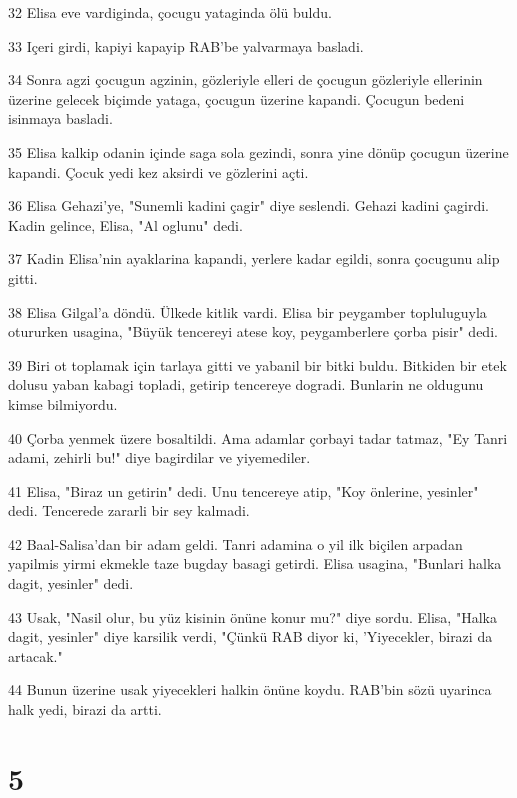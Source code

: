 \par 32 Elisa eve vardiginda, çocugu yataginda ölü buldu.
\par 33 Içeri girdi, kapiyi kapayip RAB'be yalvarmaya basladi.
\par 34 Sonra agzi çocugun agzinin, gözleriyle elleri de çocugun gözleriyle ellerinin üzerine gelecek biçimde yataga, çocugun üzerine kapandi. Çocugun bedeni isinmaya basladi.
\par 35 Elisa kalkip odanin içinde saga sola gezindi, sonra yine dönüp çocugun üzerine kapandi. Çocuk yedi kez aksirdi ve gözlerini açti.
\par 36 Elisa Gehazi'ye, "Sunemli kadini çagir" diye seslendi. Gehazi kadini çagirdi. Kadin gelince, Elisa, "Al oglunu" dedi.
\par 37 Kadin Elisa'nin ayaklarina kapandi, yerlere kadar egildi, sonra çocugunu alip gitti.
\par 38 Elisa Gilgal'a döndü. Ülkede kitlik vardi. Elisa bir peygamber topluluguyla otururken usagina, "Büyük tencereyi atese koy, peygamberlere çorba pisir" dedi.
\par 39 Biri ot toplamak için tarlaya gitti ve yabanil bir bitki buldu. Bitkiden bir etek dolusu yaban kabagi topladi, getirip tencereye dogradi. Bunlarin ne oldugunu kimse bilmiyordu.
\par 40 Çorba yenmek üzere bosaltildi. Ama adamlar çorbayi tadar tatmaz, "Ey Tanri adami, zehirli bu!" diye bagirdilar ve yiyemediler.
\par 41 Elisa, "Biraz un getirin" dedi. Unu tencereye atip, "Koy önlerine, yesinler" dedi. Tencerede zararli bir sey kalmadi.
\par 42 Baal-Salisa'dan bir adam geldi. Tanri adamina o yil ilk biçilen arpadan yapilmis yirmi ekmekle taze bugday basagi getirdi. Elisa usagina, "Bunlari halka dagit, yesinler" dedi.
\par 43 Usak, "Nasil olur, bu yüz kisinin önüne konur mu?" diye sordu. Elisa, "Halka dagit, yesinler" diye karsilik verdi, "Çünkü RAB diyor ki, 'Yiyecekler, birazi da artacak."
\par 44 Bunun üzerine usak yiyecekleri halkin önüne koydu. RAB'bin sözü uyarinca halk yedi, birazi da artti.

\chapter{5}

